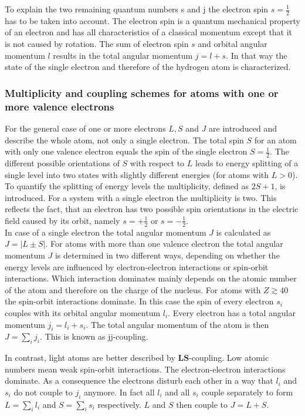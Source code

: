 \documentclass[parskip,12pt,headsepline,a4paper] {scrbook}
\begin{document}
To explain the two remaining quantum numbers s and j the electron spin $s= \frac{1}{2}$ has to be taken into account. The electron spin is a quantum mechanical property of an electron and has all characteristics of a classical momentum except that it is not caused by rotation. The sum of electron spin $s$ and orbital angular momentum $l$ results in the total angular momentum $j = l + s$. In that way the state of the single electron and therefore of the hydrogen atom is characterized.

\subsubsection{Multiplicity and coupling schemes for atoms with one or more valence electrons}
\vspace{-1\baselineskip}
For the general case of one or more electrons $L, S$ and $J$ are introduced and describe the whole atom, not only a single electron. The total spin $S$ for an atom with only one valence electron equals the spin of the single electron $S = \frac{1}{2}$. The different possible orientations of $S$ with respect to $L$ leads to energy splitting of a single level into two states with slightly different energies (for atoms with $L > 0$). To quantify the splitting of energy levels the multiplicity, defined as $2S + 1$, is introduced. For a system with a single electron the multiplicity is two. This reflects the fact, that an electron has two possible spin orientations in the electric field caused by its orbit, namely $s = +\frac{1}{2}$ or $s = -\frac{1}{2}$. \\

In case of a single electron the total angular momentum $J$ is calculated as $J = |L \pm S|$. For atoms with more than one valence electron the total angular momentum $J$ is determined in two different ways, depending on whether the energy levels are influenced by electron-electron interactions or spin-orbit interactions. Which interaction dominates mainly depends on the atomic number of the atom and therefore on the charge of the nucleus. For atoms with $Z \gtrsim 40$ the spin-orbit interactions dominate. In this case the spin of every electron $s_i$ couples with its orbital angular momentum $l_i$. Every electron has a total angular momentum $j_i = l_i + s_i$. The total angular momentum of the atom is then $J = \sum\limits_{i} j_i$. This is known as jj-coupling.

In contrast, light atoms are better described by $\mathbf{LS}$-coupling. Low atomic numbers mean weak spin-orbit interactions. The electron-electron interactions dominate. As a consequence the electrons disturb each other in a way that $l_i$ and $s_i$ do not couple to $j_i$ anymore. In fact all $l_i$ and all $s_i$ couple separately to form $L = \sum\limits_{i} l_i$ and $S = \sum\limits_{i} s_i$ respectively. $L$ and $S$ then couple to $J = L + S$.
\end{document}
